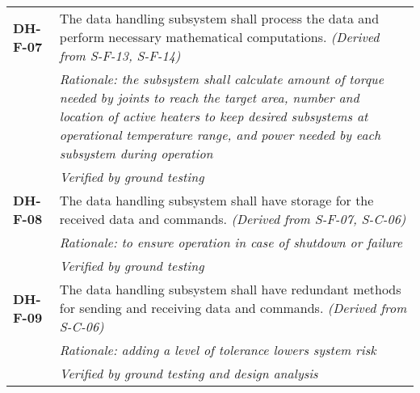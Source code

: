 \begin{longtable}{P{2cm}P{13.25cm}}
\textbf{DH-F-07}	& The data handling subsystem shall process the data and perform necessary mathematical computations. 
\textit{(Derived from S-F-13, S-F-14)}\\
& \textit{Rationale: the subsystem shall calculate amount of torque needed by joints to reach the target area, number and location of active heaters to keep desired subsystems at operational temperature range, and power needed by each subsystem during operation} \\
& \textit{Verified by ground testing}	\\

\textbf{DH-F-08}	& The data handling subsystem shall have storage for the received data and commands. \textit{(Derived from S-F-07, S-C-06)} \\
 &	\textit{Rationale: to ensure operation in case of shutdown or failure} \\
& \textit{Verified by ground testing}	\\
\textbf{DH-F-09}	& The data handling subsystem shall have redundant methods for sending and receiving data and commands. \textit{(Derived from S-C-06)} \\
 &	\textit{Rationale: adding a level of tolerance lowers system risk} \\
 &	\textit{Verified by ground testing and design analysis}
\end{longtable}
\vspace{-15pt}
